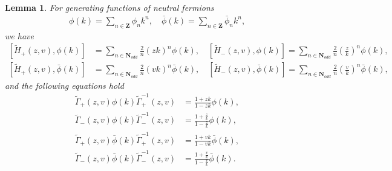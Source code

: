 \documentclass[11pt,reqno]{amsart}
\numberwithin{equation}{section}
\newtheorem{lemma}[theorem]{Lemma}
\begin{document}
	
	
	\begin{lemma}\label{H1}
		For generating functions of neutral fermions
		\begin{align}\label{BUC-feimisc}	
			\phi(k){=}\sum_{n\in\mathbf{Z}}\phi_{n}k^{n},\quad \bar{\phi}(k){=}\sum_{n\in\mathbf{Z}}\bar{\phi}_{n}k^{n},
		\end{align}
		we have
		\begin{align}\label{commutation relations 3.1}
			[\tilde{H}_{+}(z,v),\phi(k)]&=\sum\limits_{n\in\mathbf{N}_{odd}}  \frac{2}{n} (zk)^n\phi(k),\quad
			[\tilde{H}_{-}(z,v), \phi(k)]
			=\sum\limits_{n\in\mathbf{N}_{odd}}  \frac{2}{n}  \left(\frac{z}{k}\right)^n \phi(k),\\
			[\tilde{H}_{+}(z,v),\bar{\phi}(k)]&=\sum\limits_{n\in\mathbf{N}_{odd}}  \frac{2}{n} (vk)^n \bar{\phi}(k),\quad
			[\tilde{H}_{-}(z,v),\bar{\phi}(k)]=\sum\limits_{n\in\mathbf{N}_{odd}} \frac{2}{n}   \left(\frac{v}{k}\right)^n \bar{\phi}(k),
		\end{align}
		and	the following equations hold
		\begin{align}\label{commutation relations 4.1}	
			\tilde{\Gamma}_+(z,v)\phi(k)\tilde{\Gamma}_+^{-1}(z,v)
			&=\frac{1+zk}{1-zk}\phi(k),\\		\tilde{\Gamma}_-(z,v)\phi(k)\tilde{\Gamma}_-^{-1}(z,v)
			&=\frac{1+\frac{z}{k}}{1-\frac{z}{k}}  \phi(k),\\ \tilde{\Gamma}_+(z,v)\bar{\phi}(k)\tilde{\Gamma}_+^{-1}(z,v)
			&=\frac{1+vk}{1-vk}\bar{\phi}(k),\\
			\tilde{\Gamma}_-(z,v)\bar{\phi}(k)\tilde{\Gamma}_-^{-1}(z,v)
			&=\frac{1+\frac{v}{k}}{1-\frac{v}{k}} \bar{\phi}(k).
		\end{align}		
	\end{lemma}
\end{document}
